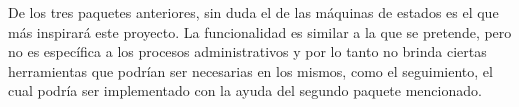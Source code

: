 De los tres paquetes anteriores, sin duda el de las máquinas de estados es el que más inspirará este proyecto. La funcionalidad es similar a la que se pretende, pero no es específica a los procesos administrativos y por lo tanto no brinda ciertas herramientas que podrían ser necesarias en los mismos, como el seguimiento, el cual podría ser implementado con la ayuda del segundo paquete mencionado.
